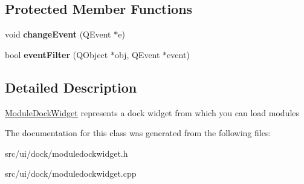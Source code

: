 \subsection*{Protected Member Functions}
\begin{DoxyCompactItemize}
\item 
\hypertarget{classModuleDockWidget_a6db5d10ff32c3494d88ddfb5dca7d942}{
void {\bfseries changeEvent} (QEvent $\ast$e)}
\label{classModuleDockWidget_a6db5d10ff32c3494d88ddfb5dca7d942}

\item 
\hypertarget{classModuleDockWidget_a45fbf665d912b7b31f91b7e107d83beb}{
bool {\bfseries eventFilter} (QObject $\ast$obj, QEvent $\ast$event)}
\label{classModuleDockWidget_a45fbf665d912b7b31f91b7e107d83beb}

\end{DoxyCompactItemize}


\subsection{Detailed Description}
\hyperlink{classModuleDockWidget}{ModuleDockWidget} represents a dock widget from which you can load modules 

The documentation for this class was generated from the following files:\begin{DoxyCompactItemize}
\item 
src/ui/dock/moduledockwidget.h\item 
src/ui/dock/moduledockwidget.cpp\end{DoxyCompactItemize}
